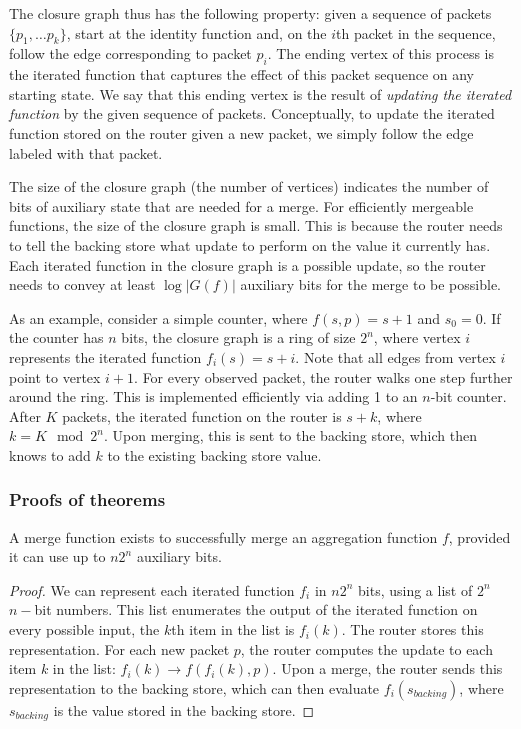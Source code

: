 The closure graph thus has the following property: given a sequence of packets
$\{p_1, \ldots p_k\}$, start at the identity function and, on the $i$th packet
in the sequence, follow the edge corresponding to packet $p_i$. The ending
vertex of this process is the iterated function that captures the effect of
this packet sequence on any starting state. We say that this ending vertex is
the result of \emph{updating the iterated function} by the given sequence of
packets. Conceptually, to update the iterated function stored on the router
given a new packet, we simply follow the edge labeled with that packet.

The size of the closure graph (\ie the number of vertices) indicates the number
of bits of auxiliary state that are needed for a merge. For efficiently
mergeable functions, the size of the closure graph is small. This is because
the router needs to tell the backing store what update to perform on the value
it currently has. Each iterated function in the closure graph is a possible
update, so the router needs to convey at least $\log |G(f)|$ auxiliary bits for
the merge to be possible.

As an example, consider a simple counter, where $f(s, p) = s + 1$ and $s_0 =
0$. If the counter has $n$ bits, the closure graph is a ring of size $2^n$,
where vertex $i$ represents the iterated function $f_i(s) = s + i$. Note
that all edges from vertex $i$ point to vertex $i+1$. For every
observed packet, the router walks one step further around the ring. This is
implemented efficiently via adding 1 to an $n$-bit counter. After $K$ packets,
the iterated function on the router is $s + k$, where $k = K \mod 2^n$. Upon
merging, this is sent to the backing store, which then knows to add $k$ to the
existing backing store value.

\subsubsection{Proofs of theorems}
\label{ss:proofs}

\begin{theorem}
A merge function exists to successfully merge an aggregation function $f$,
provided it can use up to $n2^n$ auxiliary bits.
\end{theorem}
\begin{proof}
We can represent each iterated function $f_i$ in $n2^n$ bits, using a list of
$2^n$ $n-$bit numbers. This list enumerates the output of the iterated function
on every possible input, \ie the $k$th item in the list is $f_i(k)$. The router
stores this representation. For each new packet $p$, the router computes the
update to each item $k$ in the list: $f_i(k) \rightarrow f(f_i(k), p)$. Upon a
merge, the router sends this representation to the backing store, which can
then evaluate $f_i(s_{backing})$, where $s_{backing}$ is the value stored in
the backing store.
\end{proof}


